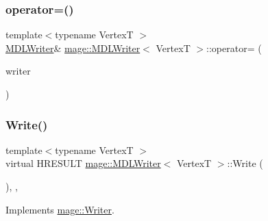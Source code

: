 \hypertarget{classmage_1_1_m_d_l_writer_ac5c21784110691e24d84d6c241a2e5f6}{}\label{classmage_1_1_m_d_l_writer_ac5c21784110691e24d84d6c241a2e5f6} 
\subsubsection{\texorpdfstring{operator=()}{operator=()}\hspace{0.1cm}{\footnotesize\ttfamily [2/2]}}
{\footnotesize\ttfamily template$<$typename VertexT $>$ \\
\hyperlink{classmage_1_1_m_d_l_writer}{M\+D\+L\+Writer}\& \hyperlink{classmage_1_1_m_d_l_writer}{mage\+::\+M\+D\+L\+Writer}$<$ VertexT $>$\+::operator= (\begin{DoxyParamCaption}\item[{\hyperlink{classmage_1_1_m_d_l_writer}{M\+D\+L\+Writer}$<$ VertexT $>$ \&\&}]{writer }\end{DoxyParamCaption})\hspace{0.3cm}{\ttfamily [delete]}}

\hypertarget{classmage_1_1_m_d_l_writer_abd4f206b457d8b97e6e38e25f7e88ed3}{}\label{classmage_1_1_m_d_l_writer_abd4f206b457d8b97e6e38e25f7e88ed3} 
\subsubsection{\texorpdfstring{Write()}{Write()}}
{\footnotesize\ttfamily template$<$typename VertexT $>$ \\
virtual H\+R\+E\+S\+U\+LT \hyperlink{classmage_1_1_m_d_l_writer}{mage\+::\+M\+D\+L\+Writer}$<$ VertexT $>$\+::Write (\begin{DoxyParamCaption}{ }\end{DoxyParamCaption})\hspace{0.3cm}{\ttfamily [override]}, {\ttfamily [private]}, {\ttfamily [virtual]}}



Implements \hyperlink{classmage_1_1_writer_a7ef124095098e7ea8f95e3be16499be3}{mage\+::\+Writer}.

\hypertarget{classmage_1_1_m_d_l_writer_af9416c1b2599ea86f4af8018dc0b9baf}{}\label{classmage_1_1_m_d_l_writer_af9416c1b2599ea86f4af8018dc0b9baf} 
